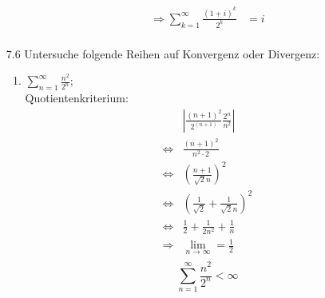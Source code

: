 \documentclass{HM}
\begin{document}
\begin{enumerate}
\begin{enumerate}
\begin{align*}
	\\
	\Rightarrow \sum\limits_{k=1}^\infty\frac{(1+i)^k}{2^k} &= i\\
\end{align*}
\end{enumerate}
\item[7.6] Untersuche folgende Reihen auf Konvergenz oder Divergenz:
\begin{enumerate}
\item $\sum\limits_{n=1}^\infty\frac{n^2}{2^n}$;\\
Quotientenkriterium:
\begin{align*}
	&\left|\frac{(n+1)^2}{2^(n+1)}\frac{2^n}{n^2}\right|\\
	\Leftrightarrow &\frac{(n+1)^2}{n^2\cdot 2}\\
	\Leftrightarrow &\left(\frac{n+1}{\sqrt{2}n}\right)^2\\
	\Leftrightarrow &\left(\frac{1}{\sqrt{2}}+\frac{1}{\sqrt{2}n}\right)^2\\
	\Leftrightarrow &\frac{1}{2} + \frac{1}{2n^2} + \frac{1}{n}\\
	\Rightarrow &\lim_{n\to\infty} = \frac{1}{2}\\
\end{align*}
$$\sum\limits_{n=1}^\infty\frac{n^2}{2^n} < \infty$$\\


\end{enumerate}
\end{enumerate}
\end{document}
